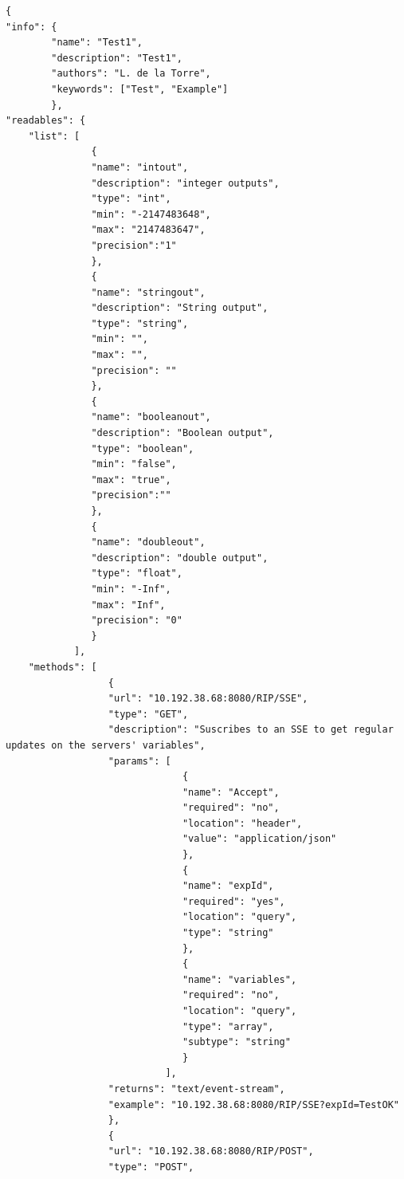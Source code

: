 \begin{lstlisting}
{
"info": {
        "name": "Test1",
        "description": "Test1",
        "authors": "L. de la Torre",
        "keywords": ["Test", "Example"]
        },
"readables": {
    "list": [
               {
               "name": "intout",
               "description": "integer outputs",
               "type": "int",
               "min": "-2147483648",
               "max": "2147483647",
               "precision":"1"
               },
               {
               "name": "stringout",
               "description": "String output",
               "type": "string",
               "min": "",
               "max": "",
               "precision": ""
               },
               {
               "name": "booleanout",
               "description": "Boolean output",
               "type": "boolean",
               "min": "false",
               "max": "true",
               "precision":""
               },
               {
               "name": "doubleout",
               "description": "double output",
               "type": "float",
               "min": "-Inf",
               "max": "Inf",
               "precision": "0"
               }
            ],
    "methods": [  
                  {
                  "url": "10.192.38.68:8080/RIP/SSE",
                  "type": "GET",
                  "description": "Suscribes to an SSE to get regular updates on the servers' variables",
                  "params": [
                               {
                               "name": "Accept",
                               "required": "no",
                               "location": "header",
                               "value": "application/json"
                               },
                               {
                               "name": "expId",
                               "required": "yes",
                               "location": "query",
                               "type": "string"
                               },
                               {
                               "name": "variables",
                               "required": "no",
                               "location": "query",
                               "type": "array",
                               "subtype": "string"
                               }
                            ],
                  "returns": "text/event-stream",
                  "example": "10.192.38.68:8080/RIP/SSE?expId=TestOK"
                  },
                  {
                  "url": "10.192.38.68:8080/RIP/POST",
                  "type": "POST",

\end{lstlisting}
